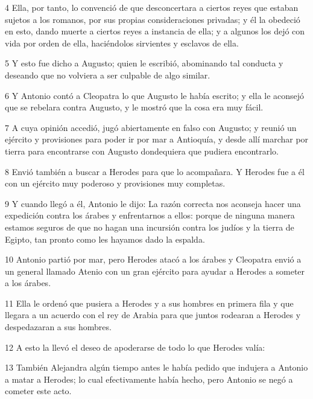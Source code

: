 \par 4 Ella, por tanto, lo convenció de que desconcertara a ciertos reyes que estaban sujetos a los romanos, por sus propias consideraciones privadas; y él la obedeció en esto, dando muerte a ciertos reyes a instancia de ella; y a algunos los dejó con vida por orden de ella, haciéndolos sirvientes y esclavos de ella.

\par 5 Y esto fue dicho a Augusto; quien le escribió, abominando tal conducta y deseando que no volviera a ser culpable de algo similar.

\par 6 Y Antonio contó a Cleopatra lo que Augusto le había escrito; y ella le aconsejó que se rebelara contra Augusto, y le mostró que la cosa era muy fácil.

\par 7 A cuya opinión accedió, jugó abiertamente en falso con Augusto; y reunió un ejército y provisiones para poder ir por mar a Antioquía, y desde allí marchar por tierra para encontrarse con Augusto dondequiera que pudiera encontrarlo.

\par 8 Envió también a buscar a Herodes para que lo acompañara. Y Herodes fue a él con un ejército muy poderoso y provisiones muy completas.

\par 9 Y cuando llegó a él, Antonio le dijo: La razón correcta nos aconseja hacer una expedición contra los árabes y enfrentarnos a ellos: porque de ninguna manera estamos seguros de que no hagan una incursión contra los judíos y la tierra de Egipto, tan pronto como les hayamos dado la espalda.

\par 10 Antonio partió por mar, pero Herodes atacó a los árabes y Cleopatra envió a un general llamado Atenio con un gran ejército para ayudar a Herodes a someter a los árabes.

\par 11 Ella le ordenó que pusiera a Herodes y a sus hombres en primera fila y que llegara a un acuerdo con el rey de Arabia para que juntos rodearan a Herodes y despedazaran a sus hombres.

\par 12 A esto la llevó el deseo de apoderarse de todo lo que Herodes valía:

\par 13 También Alejandra algún tiempo antes le había pedido que indujera a Antonio a matar a Herodes; lo cual efectivamente había hecho, pero Antonio se negó a cometer este acto.

